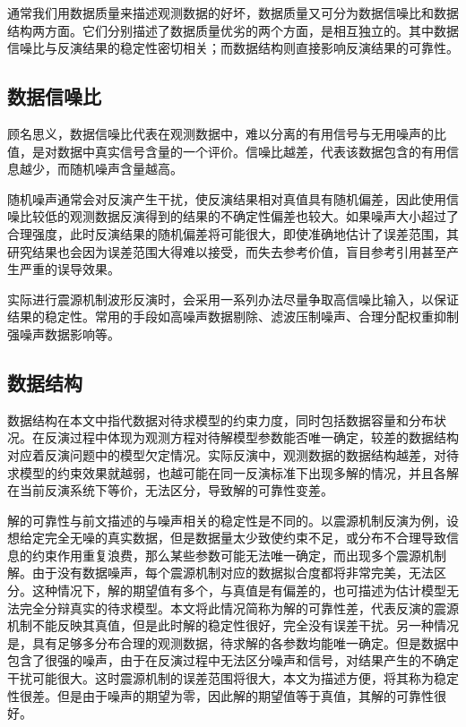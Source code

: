 通常我们用数据质量来描述观测数据的好坏，数据质量又可分为数据信噪比和数据结构两方面。它们分别描述了数据质量优劣的两个方面，是相互独立的。其中数据信噪比与反演结果的稳定性密切相关；而数据结构则直接影响反演结果的可靠性。

\subsection{数据信噪比}

顾名思义，数据信噪比代表在观测数据中，难以分离的有用信号与无用噪声的比值，是对数据中真实信号含量的一个评价。信噪比越差，代表该数据包含的有用信息越少，而随机噪声含量越高。

随机噪声通常会对反演产生干扰，使反演结果相对真值具有随机偏差，因此使用信噪比较低的观测数据反演得到的结果的不确定性偏差也较大。如果噪声大小超过了合理强度，此时反演结果的随机偏差将可能很大，即使准确地估计了误差范围，其研究结果也会因为误差范围大得难以接受，而失去参考价值，盲目参考引用甚至产生严重的误导效果。

实际进行震源机制波形反演时，会采用一系列办法尽量争取高信噪比输入，以保证结果的稳定性。常用的手段如高噪声数据剔除、滤波压制噪声、合理分配权重抑制强噪声数据影响等。

\subsection{数据结构}

数据结构在本文中指代数据对待求模型的约束力度，同时包括数据容量和分布状况。在反演过程中体现为观测方程对待解模型参数能否唯一确定，较差的数据结构对应着反演问题中的模型欠定情况。实际反演中，观测数据的数据结构越差，对待求模型的约束效果就越弱，也越可能在同一反演标准下出现多解的情况，并且各解在当前反演系统下等价，无法区分，导致解的可靠性变差。

解的可靠性与前文描述的与噪声相关的稳定性是不同的。以震源机制反演为例，设想给定完全无噪的真实数据，但是数据量太少致使约束不足，或分布不合理导致信息的约束作用重复浪费，那么某些参数可能无法唯一确定，而出现多个震源机制解。由于没有数据噪声，每个震源机制对应的数据拟合度都将非常完美，无法区分。这种情况下，解的期望值有多个，与真值是有偏差的，也可描述为估计模型无法完全分辩真实的待求模型。本文将此情况简称为解的可靠性差，代表反演的震源机制不能反映其真值，但是此时解的稳定性很好，完全没有误差干扰。另一种情况是，具有足够多分布合理的观测数据，待求解的各参数均能唯一确定。但是数据中包含了很强的噪声，由于在反演过程中无法区分噪声和信号，对结果产生的不确定干扰可能很大。这时震源机制的误差范围将很大，本文为描述方便，将其称为稳定性很差。但是由于噪声的期望为零，因此解的期望值等于真值，其解的可靠性很好。

